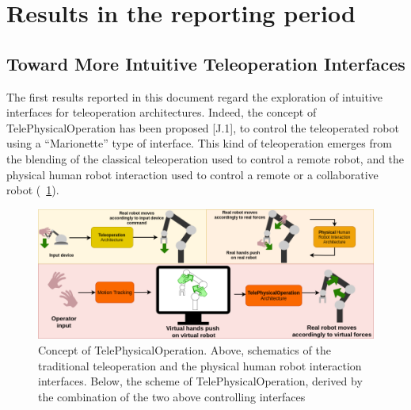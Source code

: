 \newpage
\section{Results in the reporting period}


\subsection{Toward More Intuitive Teleoperation Interfaces}
The first results reported in this document regard the exploration of intuitive interfaces for teleoperation architectures. Indeed, the concept of TelePhysicalOperation has been proposed [J.1], to control the teleoperated robot using a \enquote{Marionette} type of interface. This kind of teleoperation emerges from the blending of the classical teleoperation used to control a remote robot, and the physical human robot interaction used to control a remote or a collaborative robot (\figurename~\ref{fig:tposcheme}). 

\begin{figure}[H]
	\centering
	\includegraphics[width=0.85\linewidth]{img/TPOScheme}
	\caption{Concept of TelePhysicalOperation. Above, schematics of the traditional teleoperation and the physical human robot interaction interfaces. Below, the scheme of TelePhysicalOperation, derived by the combination of the two above controlling interfaces}
	\label{fig:tposcheme}
\end{figure}

